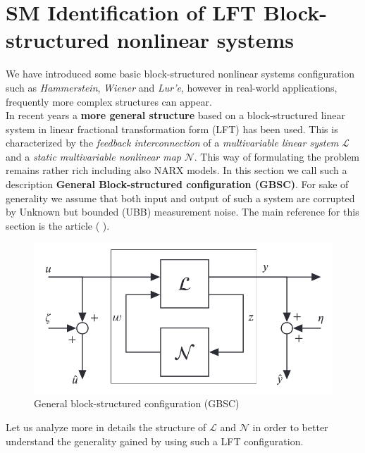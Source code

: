 
\section{SM Identification of LFT Block-structured nonlinear systems}
We have introduced some basic block-structured nonlinear systems configuration such as \textit{Hammerstein}, \textit{Wiener} and \textit{Lur'e}, however in real-world applications, frequently more complex structures can appear. \\
In recent years a \textbf{more general structure} based on a block-structured linear system in linear fractional transformation form (LFT) has been used. This is characterized by the \textit{feedback interconnection} of a \textit{multivariable linear system} $\mathcal{L}$ and a \textit{static multivariable nonlinear map} $\mathcal{N}$. This way of formulating the problem remains rather rich including also NARX models. In this section we call such a description \textbf{General Block-structured configuration (GBSC)}. For sake of generality we assume that both input and output of such a system are corrupted by Unknown but bounded (UBB) measurement noise. The main reference for this section is the article \textit{}  (\citeauthor{cerone2021unified} \cite{cerone2021unified}).

\begin{figure}
    \centering
    \includegraphics[scale=0.7]{img/LFT.png}
    \caption{General block-structured configuration (GBSC)}
    \label{fig: GBSC}
\end{figure}

Let us analyze more in details the structure of $\mathcal{L}$ and $\mathcal{N}$ in order to better understand the generality gained by using such a LFT configuration.\\

